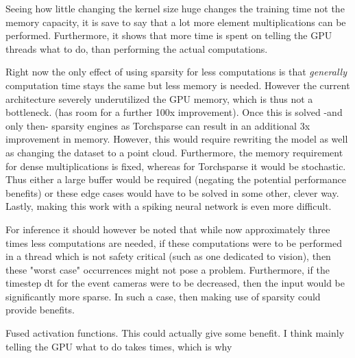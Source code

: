 

Seeing how little changing the kernel size huge changes the training time not the memory capacity, it is save to say that a lot more element multiplications can be performed. Furthermore, it shows that more time is spent on telling the GPU threads what to do, than performing the actual computations. 

Right now the only effect of using sparsity for less computations is that \textit{generally} computation time stays the same but less memory is needed. However the current architecture severely underutilized the GPU memory, which is thus not a bottleneck. (has room for a further 100x improvement). Once this is solved -and only then- sparsity engines as Torchsparse can result in an additional 3x improvement in memory. However, this would require rewriting the model as well as changing the dataset to a point cloud. Furthermore, the memory requirement for dense multiplications is fixed, whereas for Torchsparse it would be stochastic. Thus either a large buffer would be required (negating the potential performance benefits) or these edge cases would have to be solved in some other, clever way. Lastly, making this work with a spiking neural network is even more difficult. 

For inference it should however be noted that while now approximately three times less computations are needed, if these computations were to be performed in a thread which is not safety critical (such as one dedicated to vision), then these "worst case" occurrences might not pose a problem. Furthermore, if the timestep dt for the event cameras were to be decreased, then the input would be significantly more sparse. In such a case, then making use of sparsity could provide benefits. 


Fused activation functions. This could actually give some benefit. I think mainly telling the GPU what to do takes times, which is why 



